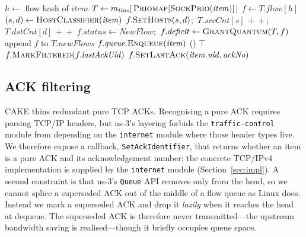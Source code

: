 \documentclass[sigconf,nonacm]{acmart}
\begin{document}
\begin{algorithm}[t]
\caption{CAKE enqueue. Flow hashing, lazy flow creation, and 
on overflow are inherited from \textsc{FqCobalt}; the host-counter update
(lines 4--7) and the  subroutine are the CAKE-specific
additions. The mark set on line~24 is consumed lazily on dequeue by
 of Algorithm~\ref{alg:dequeue}.}
\label{alg:enqueue}
\begin{algorithmic}[1]
\State $h \gets$ flow hash of $\mathit{item}$ 
\State $T \gets m_{\mathit{tins}}[\,\textproc{Priomap}[\textproc{SockPrio}(\mathit{item})]\,]$
\State $f \gets T.\mathit{flow}[h]$ 
    \State $(s, d) \gets \textproc{HostClassifier}(\mathit{item})$
    \State $f.\textproc{SetHosts}(s, d)$;\, $T.\mathit{srcCnt}[s]{\,+\!\!+}$;\, $T.\mathit{dstCnt}[d]{\,+\!\!+}$
  \EndIf
  \State $f.\mathit{status} \gets \mathit{NewFlow}$;\, $f.\mathit{deficit} \gets \textproc{GrantQuantum}(T, f)$
  \State append $f$ to $T.\mathit{newFlows}$
\EndIf
\State $f.\mathit{queue}.\textproc{Enqueue}(\mathit{item})$ 
  \State {}
\EndIf
{} () \EndIf
\State \Return $\top$
\Statex
{}
    \State \Return {}
  \EndIf
    \State $f.\textproc{MarkFiltered}(f.\mathit{lastAckUid})$ 
  \EndIf
  \State $f.\textproc{SetLastAck}(\mathit{item}.\mathit{uid}, \mathit{ackNo})$
\EndProcedure
\end{algorithmic}
\end{algorithm}

\subsection{ACK filtering}
\label{sec:ackfilter}
CAKE thins redundant pure TCP ACKs. Recognising a pure ACK requires parsing
TCP/IP headers, but ns-3's layering forbids the \texttt{traffic-control} module
from depending on the \texttt{internet} module where those header types live.
We therefore expose a callback, \texttt{SetAckIdentifier}, that returns whether
an item is a pure ACK and its acknowledgement number; the concrete TCP/IPv4
implementation is supplied by the \texttt{internet} module
(Section~\ref{sec:impl}). A second constraint is that ns-3's \texttt{Queue} API
removes only from the head, so we cannot splice a superseded ACK out of the
middle of a flow queue as Linux does. Instead we mark a superseded ACK and drop
it \emph{lazily} when it reaches the head at dequeue. The superseded ACK is
therefore never transmitted---the upstream bandwidth saving is realised---though
it briefly occupies queue space.
\end{document}
